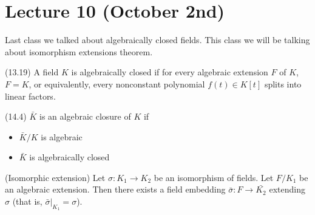 \section{Lecture 10 (October 2nd)}
\begin{rmk}
Last class we talked about algebraically closed fields. This class we will be talking about isomorphism extensions theorem.
\end{rmk}
\vspace{2ex}
\begin{defi}
(13.19) A field $K$ is algebraically closed if for every algebraic extension $F$ of $K$, $F=K$, or equivalently, every nonconstant polynomial $f(t)\in K[t]$ splits into linear factors. 
\end{defi}
\vspace{2ex}
\begin{defi}
(14.4) $\bar{K}$ is an algebraic closure of $K$ if 
\begin{itemize}
\item[(i)] $\bar{K}/K$ is algebraic
\item[(ii)] $\bar{K}$ is algebraically closed
\end{itemize}
\end{defi}
\vspace{2ex}
\begin{thm}
(Isomorphic extension) Let $\sigma:K_1\rightarrow K_2$ be an isomorphism of fields. Let $F/K_1$ be an algebraic extension. Then there exists a field embedding $\bar{\sigma }:F\rightarrow \bar{K_2}$ extending $\sigma $ (that is, $\bar{\sigma }|_{K_1}=\sigma $). 
\begin{center}
\end{center}
\end{thm}
